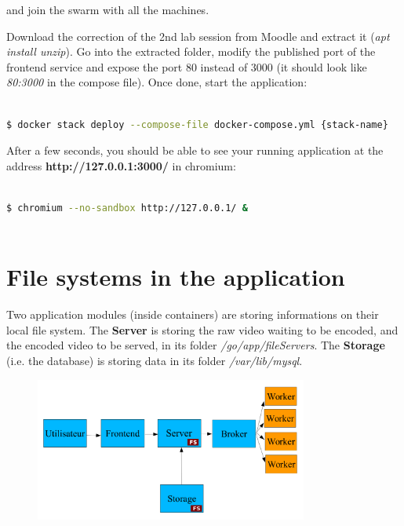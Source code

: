 \documentclass[a4paper,11pt]{exam}
\begin{document}
and join the swarm with all the machines.

Download the correction of the 2nd lab session from Moodle and extract it (\textit{apt install unzip}). 
Go into the extracted folder, modify the published port of the frontend service and expose the port 80 instead of 3000 (it should look like \textit{80:3000} in the compose file).
Once done, start the application:

\begin{lstlisting}[frame=single,language={sh}]  % Start your code-block

$ docker stack deploy --compose-file docker-compose.yml {stack-name}

\end{lstlisting}

After a few seconds, you should be able to see your running application at the address \textbf{http://127.0.0.1:3000/} in chromium:

\begin{lstlisting}[frame=single,language={sh}]  % Start your code-block

$ chromium --no-sandbox http://127.0.0.1/ &
		
\end{lstlisting}

\clearpage

\section{File systems in the application}

Two application modules (inside containers) are storing informations on their local file system. 
The \textbf{Server} is storing the raw video waiting to be encoded, and the encoded video to be served, in its folder \textit{/go/app/fileServers}. 
The \textbf{Storage} (i.e. the database) is storing data in its folder \textit{/var/lib/mysql}. 

\begin{figure}[!ht]
	\centering
	\includegraphics[width=0.8\textwidth]{fig/architecture.png}
	\label{fig:architecture}
\end{figure}
\end{document}
